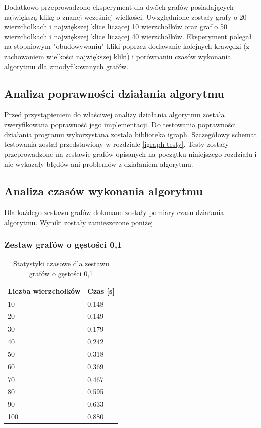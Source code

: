 \documentclass[12pt, a4paper]{article}
\begin{document}
Dodatkowo przeprowadzono eksperyment dla dwóch grafów posiadających największą klikę o znanej wcześniej wielkości. Uwzględnione zostały grafy o 20 wierzchołkach i największej klice liczącej 10 wierzchołków oraz graf o 50 wierzchołkach i największej klice liczącej 40 wierzchołków. Eksperyment polegał na stopniowym "obudowywaniu" kliki poprzez dodawanie kolejnych krawędzi (z zachowaniem wielkości największej kliki) i porównaniu czasów wykonania algorytmu dla zmodyfikowanych grafów.

\subsection{Analiza poprawności działania algorytmu}
Przed przystąpieniem do właściwej analizy działania algorytmu została zweryfikowana poprawność jego implementacji. Do testowania poprawności działania programu wykorzystana została biblioteka igraph. Szczegółowy schemat testowania został przedstawiony w rozdziale \ref{igraph-testy}.
Testy zostały przeprowadzone na zestawie grafów opisanych na początku niniejszego rozdziału i nie wykazały błędów ani problemów z działaniem algorytmu.

\subsection{Analiza czasów wykonania algorytmu}
\label{testy}
Dla każdego zestawu grafów dokonane zostały pomiary czasu działania algorytmu. Wyniki zostały zamieszczone poniżej.
\newpage
\subsubsection*{Zestaw grafów o gęstości 0,1}
\begin{table}[H]
\caption{Statystyki czasowe dla zestawu grafów o gęstości 0,1}
\begin{center}
    \begin{tabular}{|l|l|}
    \hline
    Liczba wierzchołków & Czas [s] \\ \hline
    10 & 0,148 \\ \hline
    20 & 0,149 \\ \hline
    30 & 0,179 \\ \hline
    40 & 0,242 \\ \hline
    50 & 0,318 \\ \hline
    60 & 0,369 \\ \hline
    70 & 0,467 \\ \hline
    80 & 0,595 \\ \hline
    90 & 0,633 \\ \hline
    100 & 0,880 \\ \hline
    \end{tabular}
\end{center}
\end{table}
\end{document}
